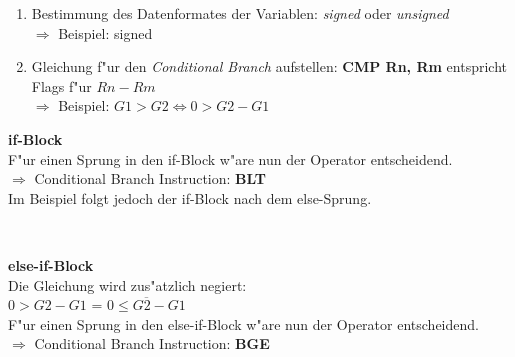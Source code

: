 \begin{enumerate}
	\item Bestimmung des Datenformates der Variablen: \textit{signed} oder \textit{unsigned}\\
			$\Rightarrow$ Beispiel: signed
	\item Gleichung f"ur den \textit{Conditional Branch} aufstellen: \textbf{CMP Rn, Rm} entspricht Flags f"ur $Rn-Rm$\\
			$\Rightarrow$ Beispiel: $G1 > G2 \Leftrightarrow  0 > G2-G1$
\end{enumerate}
    
\begin{minipage}{9cm}
	\textbf{if-Block}\\
	F"ur einen Sprung in den if-Block w"are nun der Operator \color{red} \circled{$>$} \color{black} entscheidend.\\
	$\Rightarrow$ Conditional Branch Instruction: \textbf{BLT}\\
	Im Beispiel folgt jedoch der if-Block nach dem else-Sprung.
\end{minipage}
%
\begin{minipage}{0.5cm}
	\-\
\end{minipage}
%
\begin{minipage}{9cm}
	\textbf{else-if-Block}\\
	Die Gleichung wird zus"atzlich negiert:\\
	$0 > G2-G1$ = $\overline{0 \leq G2-G1}$\\
	F"ur einen Sprung in den else-if-Block w"are nun der Operator \color{red} \circled{$\leq$} \color{black} entscheidend.\\
	$\Rightarrow$ Conditional Branch Instruction: \textbf{BGE}
\end{minipage}

\newpage












